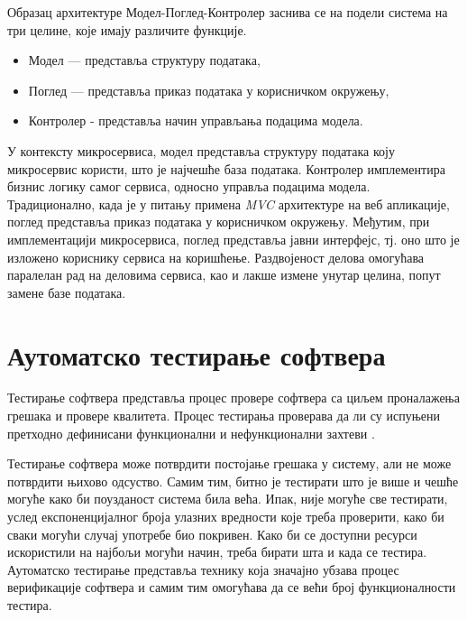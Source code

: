 \documentclass[12pt,oneside]{memoir}
\begin{document}
Образац архитектуре Модел-Поглед-Контролер заснива се на подели система на три целине, које имају различите функције.
\begin{itemize}
\item Модел — представља структуру података,
\item Поглед — представља приказ података у корисничком окружењу,
\item Контролер -  представља начин управљања подацима модела.
\end{itemize}

У контексту микросервиса, модел представља структуру података коју микросервис користи, што је најчешће база података. Контролер имплементира бизнис логику самог сервиса, односно управља подацима модела. Традиционално, када је у питању примена \textit{MVC} архитектуре на веб апликације, поглед представља приказ података у корисничком окружењу. Међутим, при имплементацији микросервиса, поглед представља јавни интерфејс, тј. оно што је изложено кориснику сервиса на коришћење. Раздвојеност делова омогућава паралелан рад на деловима сервиса, као и лакше измене унутар целина, попут замене базе података. 



\chapter{Аутоматско тестирање софтвера}
\label{chp:testiranje}

Тестирање софтвера представља процес провере софтвера са циљем проналажења грешака и провере квалитета. Процес тестирања проверава да ли су испуњени претходно дефинисани функционални и нефункционални захтеви \cite{ISTQB}.

Тестирање софтвера може потврдити постојање грешака у систему, али не може потврдити њихово одсуство. Самим тим, битно је тестирати што је више и чешће могуће како би поузданост система била већа. Ипак, није могуће све тестирати, услед експоненцијалног броја улазних вредности које треба проверити, како би сваки могући случај употребе био покривен. Како би се доступни ресурси искористили на најбољи могући начин, треба бирати шта и када се тестира. Аутоматско тестирање представља технику која значајно убзава процес верификације софтвера и самим тим омогућава да се већи број функционалности тестира.
\end{document}
